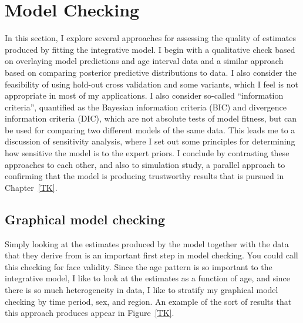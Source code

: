 \section{Model Checking}

In this section, I explore several approaches for assessing the
quality of estimates produced by fitting the integrative model.  I
begin with a qualitative check based on overlaying model predictions
and age interval data and a similar approach based on comparing
posterior predictive distributions to data.  I also consider the
feasibility of using hold-out cross validation and some variants,
which I feel is not appropriate in most of my applications.  I also
consider so-called ``information criteria'', quantified as the
Bayesian information criteria (BIC) and divergence information
criteria (DIC), which are not absolute tests of model fitness, but can
be used for comparing two different models of the same data.  This
leads me to a discussion of sensitivity analysis, where I set out
some principles for determining how sensitive the model is to the expert
priors.  I conclude by contrasting these approaches to each other, and
also to simulation study, a parallel approach to confirming that the
model is producing trustworthy results that is pursued in
Chapter~\ref{TK}.

\subsection{Graphical model checking}
Simply looking at the estimates produced by the model together with
the data that they derive from is an important first step in model
checking.  You could call this checking for face validity.  Since the
age pattern is so important to the integrative model, I like to look
at the estimates as a function of age, and since there is so much
heterogeneity in data, I like to stratify my graphical model checking
by time period, sex, and region.  An example of the sort of results
that this approach produces appear in Figure~\ref{TK}.

